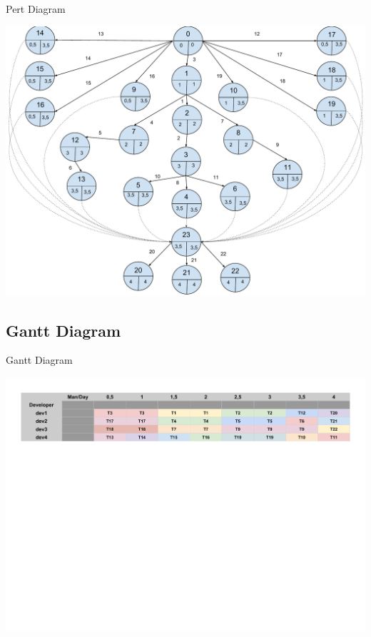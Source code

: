 \documentclass{beamer}
\begin{document}
\begin{frame}{Pert Diagram}
	\begin{center}
        \includegraphics[scale=0.32]{Pert-Sprint1.pdf}
        \end{center}
\end{frame}


\subsection{Gantt Diagram}

\begin{frame}{Gantt Diagram}
	\begin{center}
        \includegraphics[scale=0.4]{Gantt1.pdf}
        \end{center}
\end{frame}
\end{document}

